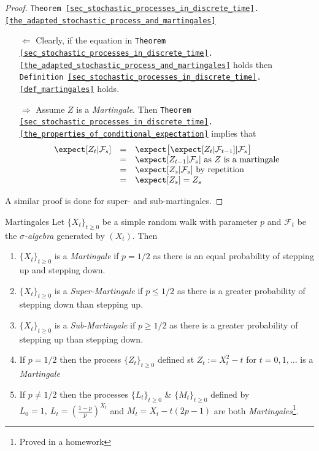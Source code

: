 \documentclass[11pt,a4paper]{article}
\begin{document}
  \begin{proof}{\texttt{Theorem \ref{sec_stochastic_processes_in_discrete_time}.\ref{the_adapted_stochastic_process_and_martingales}}}
    \begin{itemize}
      \item[$\Longleftarrow$]Clearly, if the equation in \texttt{Theorem \ref{sec_stochastic_processes_in_discrete_time}.\ref{the_adapted_stochastic_process_and_martingales}} holds then \texttt{Definition \ref{sec_stochastic_processes_in_discrete_time}.\ref{def_martingales}} holds.
      \item[$\Longrightarrow$] Assume $Z$ is a \textit{Martingale}. Then \texttt{Theorem \ref{sec_stochastic_processes_in_discrete_time}.\ref{the_properties_of_conditional_expectation}} implies that
      \[\begin{array}{rcl}
        \expect[Z_t|\mathcal{F}_s]&=&\expect\big[\expect[Z_t|\mathcal{F}_{t-1}]|\mathcal{F}_s\big]\\
        &=&\expect[Z_{t-1}|\mathcal{F}_s]\text{ as }Z\text{ is a martingale}\\
        &=&\expect[Z_s|\mathcal{F}_s]\text{ by repetition}\\
        &=&\expect[Z_s]=Z_s
      \end{array}\]
    \end{itemize}
    A similar proof is done for super- and sub-martingales.
  \end{proof}

  \begin{example}{Martingales}\label{example_martingales}
    Let $\{X_t\}_{t\geq0}$ be a simple random walk with parameter $p$ and $\mathcal{F}_t$ be the \textit{$\sigma$-algebra} generated by $(X_t)$. Then
    \begin{enumerate}
      \item $\{X_t\}_{t\geq0}$ is a \textit{Martingale} if $p=1/2$ as there is an equal probability of stepping up and stepping down.
      \item $\{X_t\}_{t\geq0}$ is a \textit{Super-Martingale} if $p\leq1/2$ as there is a greater probability of stepping down than stepping up.
      \item $\{X_t\}_{t\geq0}$ is a \textit{Sub-Martingale} if $p\geq1/2$ as there is a greater probability of stepping up than stepping down.
      \item If $p=1/2$ then the process $\{Z_t\}_{t\geq0}$ defined st $Z_t:=X_t^2-t$ for $t=0,1,\dots$ is a \textit{Martingale}
      \item If $p\neq1/2$ then the processes $\{L_t\}_{t\geq0}$ \& $\{M_t\}_{t\geq0}$ defined by $L_0=1,\ L_t=\left(\frac{1-p}p\right)^{X_t}$ and $M_t=X_t-t(2p-1)$ are both \textit{Martingales}\footnote{Proved in a homework}.
    \end{enumerate}
  \end{example}
\end{document}
